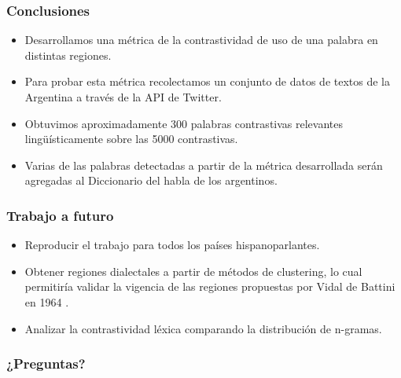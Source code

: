 \begin{frame}[c]\frametitle{Conclusiones}
    
    \begin{itemize}
        \item Desarrollamos una métrica de la contrastividad de uso de una palabra en distintas regiones.
        \item Para probar esta métrica recolectamos un conjunto de datos de textos de la Argentina a través de la API de Twitter.
        \item Obtuvimos aproximadamente 300 palabras contrastivas relevantes lingüísticamente sobre las 5000 contrastivas.
        \item Varias de las palabras detectadas a partir de la métrica desarrollada serán agregadas al Diccionario del habla de los argentinos.
    \end{itemize}

\end{frame}

\begin{frame}[c]\frametitle{Trabajo a futuro}
    
    \begin{itemize}
        \item Reproducir el trabajo para todos los países hispanoparlantes.
        \item Obtener regiones dialectales a partir de métodos de clustering, lo cual permitiría validar la vigencia de las regiones propuestas por Vidal de Battini en 1964 \cite{vidal1964espanol}.
        \item Analizar la contrastividad léxica comparando la distribución de n-gramas.
    \end{itemize}

\end{frame}

\begin{frame}[t]\frametitle{¿Preguntas?}
    
\end{frame}